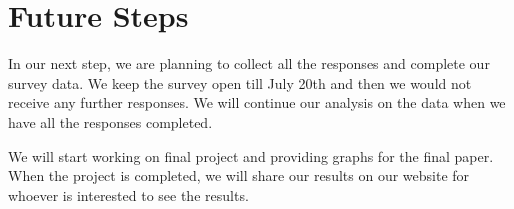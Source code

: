 \documentclass{sigchi}
\begin{document}
 \section{Future Steps}
In our next step, we are planning to collect all the responses and complete our survey data. We keep the survey open till July 20th and then we would not receive any further responses. We will continue our analysis on the data when we have all the responses completed.

We will start working on final project and providing graphs for the final paper. When the project is completed, we will share our results on our website for whoever is interested to see the results.

 

\balance{}

\balance{}

%
%
\end{document}
